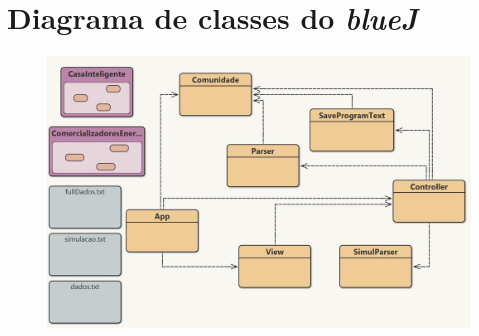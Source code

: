 \documentclass[11pt,a4paper]{report}
\begin{document}
	\pagebreak
	
	\section{Diagrama de classes do \textit{blueJ}}
	
	\begin{figure}[H]
			\includegraphics[scale=0.8]{diagrama1.jpg}
	\end{figure}
	
\end{document}
